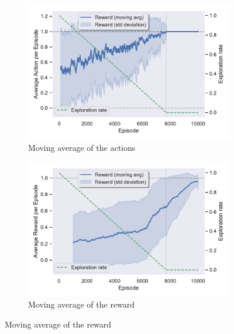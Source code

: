 \documentclass[11pt,a4paper,twoside]{report}
\newcommand{\+}{\textnormal{+} }
\theoremstyle{definition}
\numberwithin{equation}{chapter}
\begin{document}
\begin{figure}[h]
  \centering
  \begin{subfigure}{.5\textwidth}
    \centering
    \includegraphics[width=1\linewidth]{figures/Avg-Action-Pendulum.pdf}
    \caption{Moving average of the actions}
    \label{fig:ActionAveragePendulum}
  \end{subfigure}%
  \begin{subfigure}{.5\textwidth}
    \centering
    \includegraphics[width=1\linewidth]{figures/Reward-Pendulum.pdf}
    \caption{Moving average of the reward}
    \label{fig:RewardAveragePendulum}
  \end{subfigure}



\end{figure}
\end{document}
